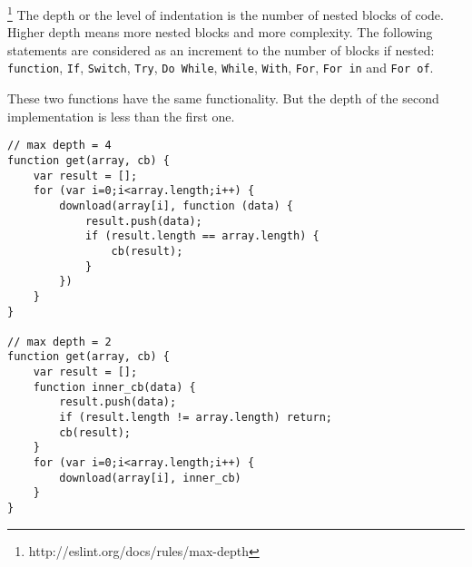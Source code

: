 \footnote{http://eslint.org/docs/rules/max-depth} The depth or the level of indentation is the number of nested blocks of code. Higher depth means more nested blocks and more complexity. The following statements are considered as an increment to the number of blocks if nested: \texttt{function}, \texttt{If}, \texttt{Switch}, \texttt{Try}, \texttt{Do While}, \texttt{While}, \texttt{With}, \texttt{For}, \texttt{For in} and \texttt{For of}.

These two functions have the same functionality. But the depth of the second implementation is less than the first one.
\begin{lstlisting}
// max depth = 4
function get(array, cb) {
    var result = [];
    for (var i=0;i<array.length;i++) {
        download(array[i], function (data) {
            result.push(data);
            if (result.length == array.length) {
                cb(result);
            }
        })
    }
}

// max depth = 2
function get(array, cb) {
    var result = [];
    function inner_cb(data) {
        result.push(data);
        if (result.length != array.length) return;
        cb(result);
    }
    for (var i=0;i<array.length;i++) {
        download(array[i], inner_cb)
    }
}
\end{lstlisting}

